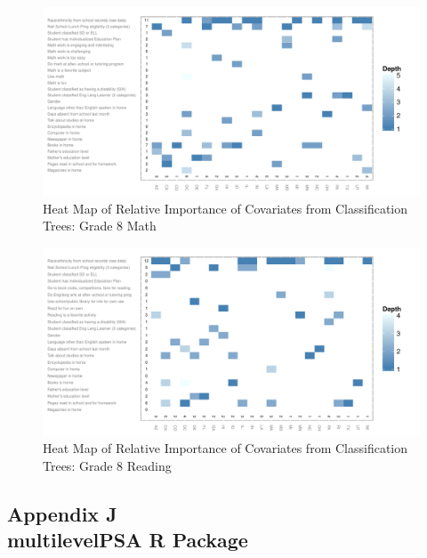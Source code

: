 \begin{figure}[h!]
\begin{center}
\includegraphics[height=.37\textheight]{../Figures2009/g8math-mlpsa-ctree-heat.pdf}
\caption{Heat Map of Relative Importance of Covariates from Classification Trees: Grade 8 Math}
\label{fig:g8math-mlpsa-ctree-heat}
\end{center}
\end{figure}

\begin{figure}[h!]
\begin{center}
\includegraphics[height=.37\textheight]{../Figures2009/g8read-mlpsa-ctree-heat.pdf}
\caption{Heat Map of Relative Importance of Covariates from Classification Trees: Grade 8 Reading}
\label{fig:g8read-mlpsa-ctree-heat}
\end{center}
\end{figure}


\clearpage
{}
\subsection*{Appendix J\\multilevelPSA R Package}
\label{multilevelPSAPackage}

